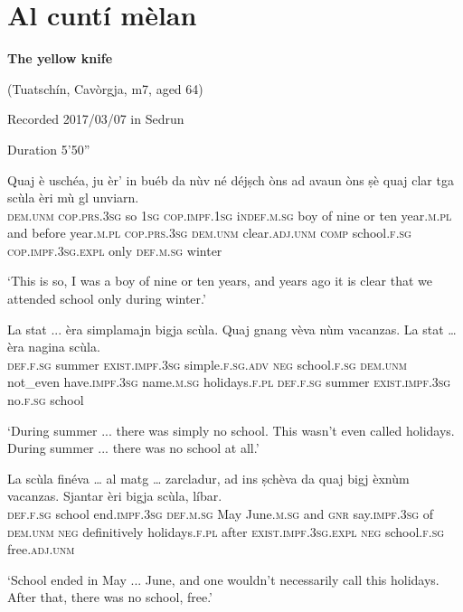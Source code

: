 \section{Al cuntí mèlan}

\noindent
\textbf{The yellow knife}

\noindent
(Tuatschín, Cavòrgja, m7, aged 64)

\noindent
Recorded 2017/03/07 in Sedrun

\noindent
Duration 5'50''

\bigskip

\begin{linenumbers}
	\gll Quaj è uschéa, ju èr’ in buéb da nùv né déjṣch òns ad avaun òns ṣè quaj clar tga scùla èri mù gl unviarn.   \\
	\textsc{dem.unm} \textsc{cop.prs.3sg} so \textsc{1sg} \textsc{cop.impf.1sg} i\textsc{ndef.m.sg} boy of nine or ten year.\textsc{m.pl} and before year\textsc{.m.pl} \textsc{cop.prs.3sg} \textsc{dem.unm} clear.\textsc{adj.unm} \textsc{comp} school.\textsc{f.sg} \textsc{cop.impf.3sg.expl} only \textsc{def.m.sg} winter\\
\end{linenumbers}
\medskip
\glt `This is so, I was a boy of nine or ten years, and years ago it is clear that we attended school only during winter.'
\medskip

\begin{linenumbers}
	\gll  La stat ... èra simplamajn bigja scùla. Quaj gnang vèva nùm vacanzas. La stat … èra nagina scùla.  \\
\textsc{def.f.sg} summer {} \textsc{exist.impf.3sg} simple.\textsc{f.sg.adv} \textsc{neg} school.\textsc{f.sg} \textsc{dem.unm} not\_even have.\textsc{impf.3sg} name.\textsc{m.sg} holidays.\textsc{f.pl} \textsc{def.f.sg} summer {} \textsc{exist.impf.3sg} no.\textsc{f.sg} school \\
\end{linenumbers}
\medskip
\glt `During summer ... there was simply no school. This wasn't even called holidays. During summer ... there was no school at all.'
\medskip

\begin{linenumbers}
	\gll  La scùla finéva … al matg … zarcladur, ad ins ṣchèva da quaj bigj èxnùm vacanzas. Sjantar èri bigja scùla, líbar.  \\
	\textsc{def.f.sg} school end.\textsc{impf.3sg} {} \textsc{def.m.sg} May {} June.\textsc{m.sg} and \textsc{gnr} say.\textsc{impf.3sg} of \textsc{dem.unm} \textsc{neg} definitively holidays.\textsc{f.pl} after \textsc{exist.impf.3sg.expl} \textsc{neg} school.\textsc{f.sg} free.\textsc{adj.unm}    \\
\end{linenumbers}
\medskip
\glt `School ended in May ... June, and one wouldn't necessarily call this holidays. After that, there was no school, free.'
\medskip

